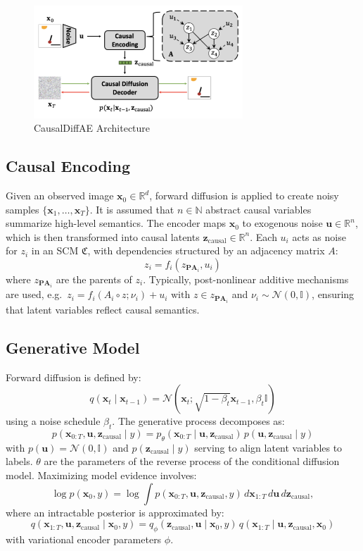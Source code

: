 \documentclass{article}
\newcommand{\x}{\mathbf{x}}
\newcommand{\ub}{\mathbf{u}}
\newcommand{\zc}{\textbf{z}_\text{causal}}
\newcommand{\C}{\mathfrak{C}}
\newcommand{\N}{\mathcal{N}}
\begin{document}
	\begin{figure}[H]
		\centering
		\includegraphics[width=0.7\textwidth]{images/causaldiffae_architecture}
		\caption{CausalDiffAE Architecture}
		\label{fig:causaldiffae_architecture}
	\end{figure}
	
	\subsection*{Causal Encoding}
	
	Given an observed image $\x_0 \in \mathbb{R}^d$, forward diffusion is applied to create noisy samples $\{\x_1, \ldots, \x_T\}$. It is assumed that $n \in \mathbb{N}$ abstract causal variables summarize high-level semantics. The encoder maps $\x_0$ to exogenous noise $\ub \in \mathbb{R}^n$, which is then transformed into causal latents $\zc \in \mathbb{R}^n$. Each $u_i$ acts as noise for $z_i$ in an SCM $\C$, with dependencies structured by an adjacency matrix $A$:
	$$
	z_i = f_i(z_{\mathbf{PA}_i}, u_i)
	$$
	where $z_{\mathbf{PA}_i}$ are the parents of $z_i$. Typically, post-nonlinear additive mechanisms are used, e.g.\ $z_i = f_i(A_i \circ z; \nu_i) + u_i \text{ with } z \in z_{\mathbf{PA}_i}$ and $\nu_i \sim \N(0, \mathbb{I})$, ensuring that latent variables reflect causal semantics.
	
	\subsection*{Generative Model}
	
	Forward diffusion is defined by:
	$$
	q(\x_t \mid \x_{t-1}) = \N(\x_t ; \sqrt{1-\beta_t}\x_{t-1}, \beta_t \mathbb{I})
	$$
	using a noise schedule $\beta_t$. The generative process decomposes as:
	$$
	p(\x_{0:T}, \ub, \zc \mid y) = p_{\theta}(\x_{0:T} \mid \ub, \zc)\, p(\ub, \zc \mid y)
	$$
	with $p(\ub) = \N(0, \mathbb{I})$ and $p(\zc \mid y)$ serving to align latent variables to labels. $\theta$ are the parameters of the reverse process of the conditional diffusion model. Maximizing model evidence involves:
	$$
	\log p(\x_0, y) = \log \int p(\x_{0:T}, \ub, \zc, y) \, d\x_{1:T} \, d\ub\, d\zc,
	$$
	where an intractable posterior is approximated by:
	$$
	q(\x_{1:T}, \ub, \zc \mid \x_0, y) = q_\phi(\zc, \ub \mid \x_0, y)\, q(\x_{1:T} \mid \ub, \zc, \x_0)
	$$
	with variational encoder parameters $\phi$.
	
\end{document}

